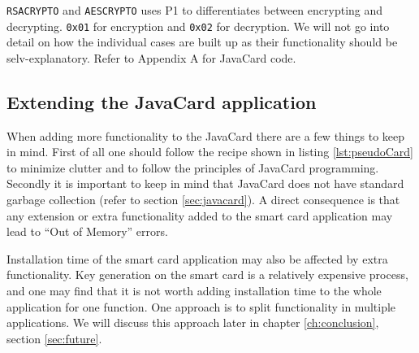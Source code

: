 \texttt{RSACRYPTO} and \texttt{AESCRYPTO} uses P1 to differentiates between encrypting and decrypting. \texttt{0x01} for encryption and \texttt{0x02} for decryption.
We will not go into detail on how the individual cases are built up as their functionality should be selv-explanatory. Refer to Appendix A for JavaCard code.

\subsection{Extending the JavaCard application}
When adding more functionality to the JavaCard there are a few things to keep in mind. First of all one should follow the recipe shown in listing \ref{lst:pseudoCard} to minimize clutter and to follow the principles of JavaCard programming. Secondly it is important to keep in mind that JavaCard does not have standard garbage collection (refer to section \ref{sec:javacard}). A direct consequence is that any extension or extra functionality added to the smart card application may lead to ``Out of Memory'' errors.

Installation time of the smart card application may also be affected by extra functionality. Key generation on the smart card is a relatively expensive process, and one may find that it is not worth adding installation time to the whole application for one function. One approach is to split functionality in multiple applications. We will discuss this approach later in chapter \ref{ch:conclusion}, section \ref{sec:future}.
